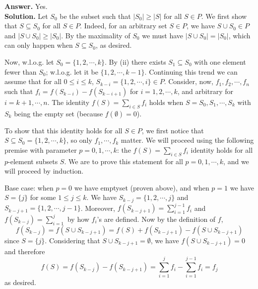 \documentclass[11pt,a4paper]{article}
\newcommand{\<}{\langle}
\renewcommand{\>}{\rangle}
\newcommand{\dsum}{\displaystyle\sum}
\begin{document}
\begin{enumerate}
	\textbf{Answer.} Yes. \\
	\textbf{Solution.} Let $S_0$ be the subset such that $|S_0|\ge |S|$ for all $S\in P$. We first show that $S\subseteq S_0$ for all $S\in P$. Indeed, for an arbitrary set $S\in P$, we have $S\cup S_0\in P$ and $|S\cup S_0|\ge |S_0|$. By the maximality of $S_0$ we must have $|S\cup S_0|=|S_0|$, which can only happen when $S\subseteq S_0$, as desired. 
	
	Now, w.l.o.g. let $S_0=\{1, 2, \cdots , k\}$. By (ii) there exists $S_1\subseteq S_0$ with one element fewer than $S_0$; w.l.o.g. let it be $\{1, 2, \cdots , k-1\}$. Continuing this trend we can assume that for all $0\le i\le k$, $S_{k-i}=\{1, 2, \cdots , i\}\in P$. Consider, now, $f_1, f_2, \cdots , f_n$ such that $f_i = f(S_{k-i})-f(S_{k-i+1})$ for $i=1, 2, \cdots , k$, and arbitrary for $i=k+1, \cdots , n$. 
	The identity $f(S)=\sum_{i\in S}f_i$ holds when $S=S_0, S_1, \cdots, S_k$ with $S_k$ being the empty set (because $f(\emptyset)=0$). 
	
	To show that this identity holds for all $S\in P$, we first notice that $S\subseteq S_0=\{1, 2, \cdots , k\}$, so only $f_1, \cdots , f_k$ matter. We will proceed using the following premise with parameter $p=0, 1, \cdots , k$: the $f(S)=\sum_{i\in S} f_i$ identity holds for all $p$-element subsets $S$. We are to prove this statement for all $p=0, 1, \cdots , k$, and we will proceed by induction. 
	
	Base case: when $p=0$ we have emptyset (proven above), and when $p=1$ we have $S=\{j\}$ for some $1\le j\le k$. We have $S_{k-j}=\{1, 2, \cdots , j\}$ and $S_{k-j+1}=\{1, 2, \cdots , j-1\}$. Moreover, $f(S_{k-j+1})=\dsum_{i=1}^{j-1} f_i$ and $f(S_{k-j})=\dsum_{i=1}^j$ by how $f_i$'s are defined. Now by the definition of $f$, 
	\[
	f(S_{k-j}) = f(S\cup S_{k-j+1}) = f(S)+f(S_{k-j+1}) - f(S\cup S_{k-j+1})
	\]
	since $S=\{j\}$. Considering that $S\cup S_{k-j+1}=\emptyset$, we have $f(S\cup S_{k-j+1})=0$ and therefore 
	\[
	f(S)=f(S_{k-j}) - f(S_{k-j+1}) = \dsum_{i=1}^{j} f_i - \dsum_{i=1}^{j-1} f_i = f_j
	\]
	as desired. 
	

\end{enumerate}
\end{document}
